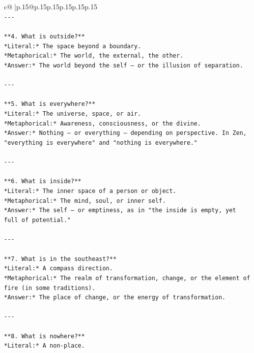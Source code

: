 \documentclass{article}
\begin{document}
{\begin{supertabular}{c@{$\;$}|p{.15\linewidth}@{}p{.15\linewidth}p{.15\linewidth}p{.15\linewidth}p{.15\linewidth}p{.15\linewidth}}
{{{\\ 
\texttt{{-}{-}{-}} \\
\\ 
\texttt{**4. What is outside?**  } \\
\texttt{*Literal:* The space beyond a boundary.  } \\
\texttt{*Metaphorical:* The world, the external, the other.  } \\
\texttt{*Answer:* The world beyond the self — or the illusion of separation.} \\
\\ 
\texttt{{-}{-}{-}} \\
\\ 
\texttt{**5. What is everywhere?**  } \\
\texttt{*Literal:* The universe, space, or air.  } \\
\texttt{*Metaphorical:* Awareness, consciousness, or the divine.  } \\
\texttt{*Answer:* Nothing — or everything — depending on perspective. In Zen, "everything is everywhere" and "nothing is everywhere."} \\
\\ 
\texttt{{-}{-}{-}} \\
\\ 
\texttt{**6. What is inside?**  } \\
\texttt{*Literal:* The inner space of a person or object.  } \\
\texttt{*Metaphorical:* The mind, soul, or inner self.  } \\
\texttt{*Answer:* The self — or emptiness, as in "the inside is empty, yet full of potential."} \\
\\ 
\texttt{{-}{-}{-}} \\
\\ 
\texttt{**7. What is in the southeast?**  } \\
\texttt{*Literal:* A compass direction.  } \\
\texttt{*Metaphorical:* The realm of transformation, change, or the element of fire (in some traditions).  } \\
\texttt{*Answer:* The place of change, or the energy of transformation.} \\
\\ 
\texttt{{-}{-}{-}} \\
\\ 
\texttt{**8. What is nowhere?**  } \\
\texttt{*Literal:* A non{-}place.  } \\
}}}
\end{supertabular}}
\end{document}
